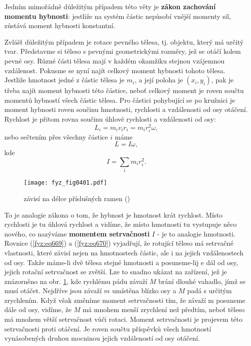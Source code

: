     Jedním mimořádně důležitým případem této věty je \textbf{zákon zachování momentu hybnosti}:
    jestliže na systém částic nepůsobí vnější momenty sil, zůstává moment hybnosti konstantní.

    Zvlášť důležitým případem je rotace pevného tělesa, tj. objektu, který má určitý tvar.
    Představme si těleso s pevnými geometrickými rozměry, jež se otáčí kolem pevné osy. Různé části
    tělesa mají v každém okamžiku stejnou vzájemnou vzdálenost. Pokusme se nyní najít celkový moment
    hybnosti tohoto tělesa. Jestliže hmotnost jedné z částic tělesa je \(m_i\), a její poloha je
    \((x_i, y_i)\), pak je třeba najít moment hybnosti této částice, neboť celkový moment je roven
    součtu momentů hybností všech částic tělesa. Pro částici pohybující se po kružnici je moment
    hybnosti roven součinu hmotnosti, rychlosti a vzdálenosti od osy otáčení. Rychlost je přitom
    rovna součinu úhlové rychlosti a vzdálenosti od osy:
    \begin{equation}\label{fyz:eq668}
      L_i=m_iv_ir_i=m_ir^2_iω,
    \end{equation}
    nebo sečtením přes všechny částice \(i\) máme
    \begin{equation}\label{fyz:eq669}
      L=Iω,
    \end{equation}
    kde 
    \begin{equation}\label{fyz:eq670}
      I=∑_im_ir^2_i.
    \end{equation}   

    \begin{figure}[ht!] %
      \centering
      \texttt{[image: fyz\_fig0401.pdf]}
      \caption{ závisí na délce příslušných ramen
              (\cite[s.~10000]{Feynman01})}
      \label{fyz:fig0401}
    \end{figure}  

    To je analogie zákona o tom, že hybnost je hmotnost krát rychlost. Místo rychlosti je tu úhlová
    rychlost a vidíme, že místo hmotnosti tu vystupuje něco nového, co nazýváme \textbf{momentem
    setrvačnosti} \(I\) - je to analogie hmotnosti. Rovnice (\ref{fyz:eq669}) a (\ref{fyz:eq670})
    vyjadřují, že rotující těleso má setrvačné vlastnosti, které závisí nejen na hmotnostech částic,
    ale i na jejich vzdálenostech od osy. Takže máme-li dvě tělesa stejné hmotnosti a posuneme-lij e
    dál od osy, jejich rotační setrvačnost se zvětší. Lze to snadno ukázat na zařízení, jež je
    znázorněno na obr. \ref{fyz:fig0401}, kde rychlému pádu závaží \(M\) brání dlouhé vahadlo, jímž
    se musí otáčet. Nejdříve jsou závaží \(m\) umístěna blízko osy a \(M\) padá s určitým
    zrychlením. Když však změníme moment setrvačnosti tím, že závaží m posuneme dále od osy, vidíme,
    že \(M\) má mnohem menší zrychlení než předtím, neboť těleso má mnohem větší setrvačnost vůči
    rotaci. Moment setrvačnosti je projevem této setrvačnosti proti otáčení. Je roven součtu
    příspěvků všech hmotností vynásobených druhou mocninou jejich vzdáleností od osy otáčení.

